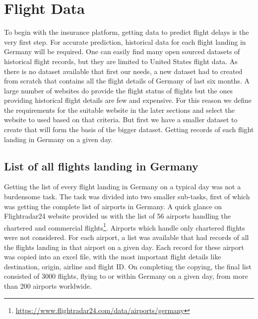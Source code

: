 \chapter{Flight Data}
To begin with the insurance platform, getting data to predict flight delays is the very first step. For accurate prediction, historical data for each flight landing in Germany will be required. One can easily find many open sourced datasets of historical flight records, but they are limited to United States flight data. As there is no dataset available that first our needs, a new dataset had to created from scratch that contains all the flight details of Germany of last six months. A large number of websites do provide the flight status of flights but the ones providing historical flight details are few and expensive. For this reason we define the requirements for the suitable website in the later sections and select the website to used based on that criteria. But first we have a smaller dataset to create that will form the basis of the bigger dataset. Getting records of each flight landing in Germany on a given day.

\section{List of all flights landing in Germany}
Getting the list of every flight landing in Germany on a typical day was not a burdensome task. The task was divided into two smaller sub-tasks, first of which was getting the complete list of airports in Germany. A quick glance on Flightradar24 website provided us with the list of 56 airports handling the chartered and commercial flights\footnote{\url{https://www.flightradar24.com/data/airports/germany}}. Airports which handle only chartered flights were not considered. For each airport, a list was available that had records of all the flights landing in that airport on a given day. Each record for these airport was copied into an excel file, with the most important flight details like destination, origin, airline and flight ID. On completing the copying, the final list consisted of 3000 flights, flying to or within Germany on a given day, from more than 200 airports worldwide.

